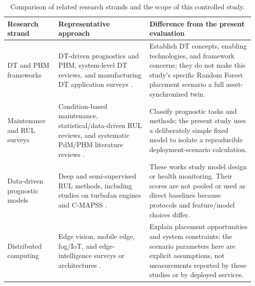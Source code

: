 ﻿\documentclass[conference]{IEEEtran}
\begin{document}
\begin{table}[t]
\caption{Comparison of related research strands and the scope of this controlled study.}
\label{tab:priorwork}
\centering
\scriptsize
\setlength{\tabcolsep}{3pt}
\renewcommand{\arraystretch}{1.2}
\begin{tabular}{p{2.7cm}p{6.0cm}p{7.3cm}}
\toprule
Research strand & Representative approach & Difference from the present evaluation \\
\midrule
DT and PHM frameworks & DT-driven prognostics and PHM, system-level DT reviews, and manufacturing DT application surveys \cite{tao2018,toothman2023,tao2019,fuller2020,rasheed2020,barricelli2019,jones2020,semeraro2021,cimino2019}. & Establish DT concepts, enabling technologies, and framework concerns; they do not make this study's specific Random Forest placement scenario a full asset-synchronized twin. \\
Maintenance and RUL surveys & Condition-based maintenance, statistical/data-driven RUL reviews, and systematic PdM/PHM literature reviews \cite{jardine2006,si2011,peng2010,lei2018,carvalho2019,zonta2020,dalzochio2020,ahmadzadeh2014,xue2022,zhang2023}. & Classify prognostic tasks and methods; the present study uses a deliberately simple fixed model to isolate a reproducible deployment-scenario calculation. \\
Data-driven prognostic models & Deep and semi-supervised RUL methods, including studies on turbofan engines and C-MAPSS \cite{asif2022,aldulaimi2019,ellefsen2019,zhao2019,li2023}. & These works study model design or health monitoring. Their scores are not pooled or used as direct baselines because protocols and feature/model choices differ. \\
Distributed computing & Edge vision, mobile edge, fog/IoT, and edge-intelligence surveys or architectures \cite{shi2016,firouzi2022,mao2017,abbas2018,zhou2019,satya2017,chiang2016,naha2018}. & Explain placement opportunities and system constraints; the scenario parameters here are explicit assumptions, not measurements reported by these studies or by deployed services. \\
\bottomrule
\end{tabular}
\end{table}
\end{document}
